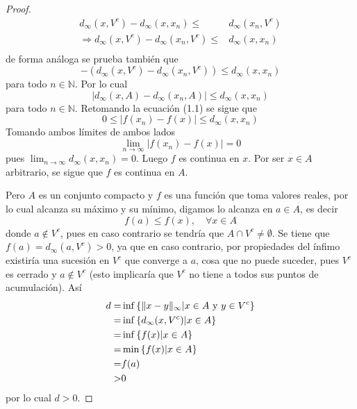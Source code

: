 \documentclass[12pt]{report}
\theoremstyle{largebreak}
\newcommand\abs[1]{\ensuremath{\lvert#1\rvert}}
\begin{document}
\begin{proof}
    \begin{equation*}
        \begin{split}
            d_{\infty}(x,V^c)-d_{\infty}(x,x_n)\leq&d_{\infty}(x_n,V^c)\\
            \Rightarrow d_{\infty}(x,V^c)-d_{\infty}(x_n,V^c)\leq&d_{\infty}(x,x_n)\\
        \end{split}
    \end{equation*}
    de forma análoga se prueba también que
    \begin{equation*}
        -\left(d_{\infty}(x,V^c)-d_{\infty}(x_n,V^c)\right)\leq d_{\infty}(x,x_n)
    \end{equation*}
    para todo $n\in\mathbb{N}$. Por lo cual
    \begin{equation*}
        \abs{d_{\infty}(x,A)-d_{\infty}(x_n,A)}\leq d_{\infty}(x, x_n)
    \end{equation*}
    para todo $n\in\mathbb{N}$. Retomando la ecuación (1.1) se sigue que
    \begin{equation*}
        0\leq\abs{f(x_n)-f(x)}\leq d_{\infty}(x,x_n)
    \end{equation*}
    Tomando ambos límites de ambos lados
    \begin{equation*}
        \lim_{n\rightarrow\infty}\abs{f(x_n)-f(x)}=0
    \end{equation*}
    pues $\lim_{n\rightarrow\infty}d_{\infty}(x,x_n)=0$. Luego $f$ es continua en $x$. Por ser $x\in A$ arbitrario, se sigue que $f$ es continua en $A$.

    Pero $A$ es un conjunto compacto y $f$ es una función que toma valores reales, por lo cual alcanza su máximo y su mínimo, digamos lo alcanza en $a\in A$, es decir
    \begin{equation*}
        f(a)\leq f(x),\quad\forall x\in A
    \end{equation*}
    donde $a\notin V^c$, pues en caso contrario se tendría que $A\cap V^c\neq \emptyset$. Se tiene que $f(a)=d_{\infty}(a,V^c)>0$, ya que en caso contrario, por propiedades del ínfimo existiría una sucesión en $V^c$ que converge a $a$, cosa que no puede suceder, pues $V^c$ es cerrado y $a\notin V^c$ (esto implicaría que $V^c$ no tiene a todos sus puntos de acumulación). Así
    \begin{equation*}
        \begin{split}
            d=&\inf\left\{\|x-y\|_{\infty}|x\in A \textup{ y }y\in V^c\right\}\\
            =&\inf\left\{d_{\infty}(x,V^c)|x\in A\right\}\\
            =&\inf\left\{f(x)|x\in A\right\}\\
            =&\min\left\{f(x)|x\in A\right\}\\
            =&f(a)\\
            >&0\\
        \end{split}
    \end{equation*}
    por lo cual $d>0$.
    

\end{proof}
\end{document}
